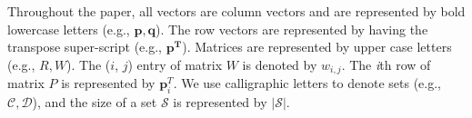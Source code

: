 Throughout the paper, all vectors are column vectors and are represented by
bold lowercase letters (e.g., $\bm{p,q}$). The row vectors are represented by
having the transpose super-script (e.g., $\bm{p^T}$). Matrices are represented by upper
case letters (e.g., ${R,W}$). The ($i$, $j$) entry of matrix $W$ is denoted by
$w_{i,j}$. The \textit{i}th row of matrix $P$ is represented by $\bm{p}_i^T$. We use calligraphic letters to denote sets (e.g.,
$\mathcal{C,D}$), and the size of a set $\mathcal{S}$ is represented by
$|\mathcal{S}|$. 



